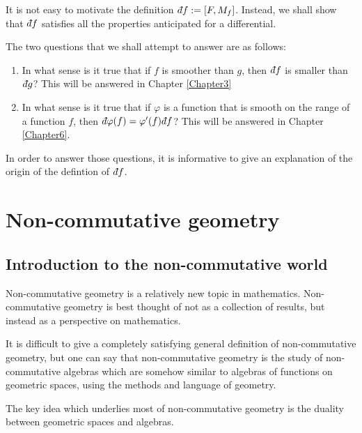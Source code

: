 It is not easy to motivate the definition $\qd f := [F,M_f]$. Instead,
we shall show that $\qd f$ satisfies all the properties
anticipated for a differential. 

The two questions that we shall attempt to answer are as follows:
\begin{enumerate}
    \item{} In what sense is it true that if $f$ is smoother than $g$, then $\qd f$
    is smaller than $\qd g$? This will be answered in Chapter \ref{Chapter3}
    \item{} In what sense is it true that if $\varphi$ is a function that is smooth
    on the range of a function $f$, then $\qd \varphi(f) = \varphi'(f)\qd f$? This
    will be answered in Chapter \ref{Chapter6}.
\end{enumerate}

In order to answer those questions, it is informative to give an explanation
of the origin of the defintion of $\qd f$. 

\section{Non-commutative geometry}

\subsection{Introduction to the non-commutative world}
Non-commutative geometry is a relatively new topic in mathematics. Non-commutative
geometry is best thought of not as a collection of results, but instead as a
perspective on mathematics. 

It is difficult to give a completely satisfying general definition of non-commutative geometry, but 
one can say that non-commutative geometry is the study of non-commutative algebras
which are somehow similar to algebras of functions on geometric spaces, using
the methods and language of geometry.

The key idea which underlies most of non-commutative geometry is the duality
between geometric spaces and algebras. 

